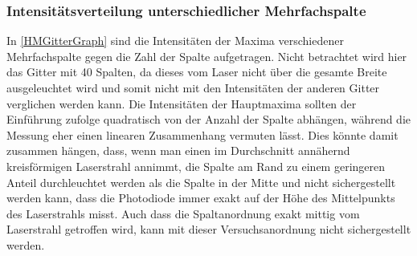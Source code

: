 \documentclass[
	a4paper,
	12pt,
	pagesize,
	ngerman
]{scrartcl}
\begin{document}
	\subsubsection{Intensitätsverteilung unterschiedlicher Mehrfachspalte}
	In \cref{HMGitterGraph} sind die Intensitäten der Maxima verschiedener Mehrfachspalte gegen die Zahl der Spalte aufgetragen.
	Nicht betrachtet wird hier das Gitter mit 40 Spalten, da dieses vom Laser nicht über die gesamte Breite ausgeleuchtet wird und somit nicht mit den Intensitäten der anderen Gitter verglichen werden kann.
	Die Intensitäten der Hauptmaxima sollten der Einführung zufolge quadratisch von der Anzahl der Spalte abhängen, während die Messung eher einen linearen Zusammenhang vermuten lässt.
	Dies könnte damit zusammen hängen, dass, wenn man einen im Durchschnitt annähernd kreisförmigen Laserstrahl annimmt, die Spalte am Rand zu einem geringeren Anteil durchleuchtet werden als die Spalte in der Mitte und nicht sichergestellt werden kann, dass die Photodiode immer exakt auf der Höhe des Mittelpunkts des Laserstrahls misst.
	Auch dass die Spaltanordnung exakt mittig vom Laserstrahl getroffen wird, kann mit dieser Versuchsanordnung nicht sichergestellt werden.
	
\end{document}
